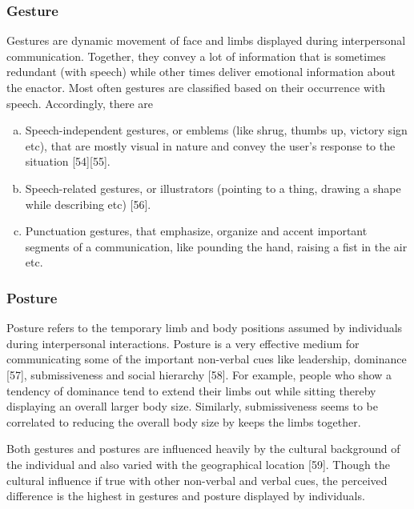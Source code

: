\documentclass[oneside,11pt]{memoir}
\begin{document}
\subsubsection{Gesture}
Gestures are dynamic movement of face and limbs displayed during interpersonal communication. Together, they convey a lot of information that is sometimes redundant (with speech) while other times deliver emotional information about the enactor. Most often gestures are classified based on their occurrence with speech. Accordingly, there are
\begin{enumerate} [(a)]
\item Speech-independent gestures, or emblems (like shrug, thumbs up, victory sign etc), that are mostly visual in nature and convey the user's response to the situation [54][55].
\item Speech-related gestures, or illustrators (pointing to a thing, drawing a shape while describing etc) [56].
\item Punctuation gestures, that emphasize, organize and accent important segments of a communication, like pounding the hand, raising a fist in the air etc.
    \end{enumerate}

\subsubsection{Posture}
Posture refers to the temporary limb and body positions assumed by individuals during interpersonal interactions.  Posture is a very effective medium for communicating some of the important non-verbal cues like leadership, dominance [57], submissiveness and social hierarchy [58]. For example, people who show a tendency of dominance tend to extend their limbs out while sitting thereby displaying an overall larger body size. Similarly, submissiveness seems to be correlated to reducing the overall body size by keeps the limbs together.

Both gestures and postures are influenced heavily by the cultural background of the individual and also varied with the geographical location [59]. Though the cultural influence if true with other non-verbal and verbal cues, the perceived difference is the highest in gestures and posture displayed by individuals.
\end{document}
